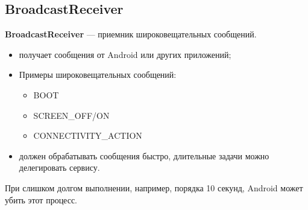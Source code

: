 \subsection{BroadcastReceiver}
\textbf{BroadcastReceiver} --- приемник широковещательных сообщений.

\begin{itemize}
	\item получает сообщения от Android или других приложений;
	\item Примеры широковещательных сообщений:
	\begin{itemize}
		\item BOOT
		\item SCREEN\_OFF/ON
		\item CONNECTIVITY\_ACTION
	\end{itemize}
	\item должен обрабатывать сообщения быстро, длительные задачи можно делегировать сервису.
\end{itemize}

При слишком долгом выполнении, например, порядка 10 секунд, Android может убить этот процесс.